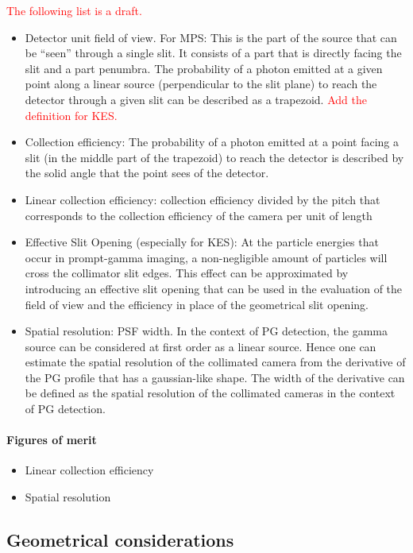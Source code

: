 \documentclass[a4paper,english]{article}
\begin{document}
\textcolor{red}{The following list is a draft.}
\begin{itemize}
  \item Detector unit field of view. For MPS: This is the part of the source that can be “seen” through a single slit. It consists of a part that is directly facing the slit and a part penumbra. The probability of a photon emitted at a given point along a linear source (perpendicular to the slit plane) to reach the detector through a given slit can be described as a trapezoid. \textcolor{red}{Add the definition for KES.}
  \item Collection efficiency: The probability of a photon emitted at a point facing a slit (in the middle part of the trapezoid) to reach the detector is described by the solid angle that the point sees of the detector.
  \item Linear collection efficiency: collection efficiency divided by the pitch that corresponds to the collection efficiency of the camera per unit of length
  \item Effective Slit Opening (especially for KES): At the particle energies that occur in prompt-gamma imaging, a non-negligible amount of particles will cross the collimator slit edges. This effect can be approximated by introducing an effective slit opening that can be used in the evaluation of the field of view and the efficiency in place of the geometrical slit opening. 
  \item Spatial resolution: PSF width. In the context of PG detection, the gamma source can be considered at first order as a linear source. Hence one can estimate the spatial resolution of the collimated camera from the derivative of the PG profile that has a gaussian-like shape. The width of the derivative can be defined as the spatial resolution of the collimated cameras in the context of PG detection.
\end{itemize}

\paragraph{Figures of merit}

\begin{itemize}
  \item Linear collection efficiency
  \item Spatial resolution
\end{itemize}


\subsection{Geometrical considerations}
\end{document}

